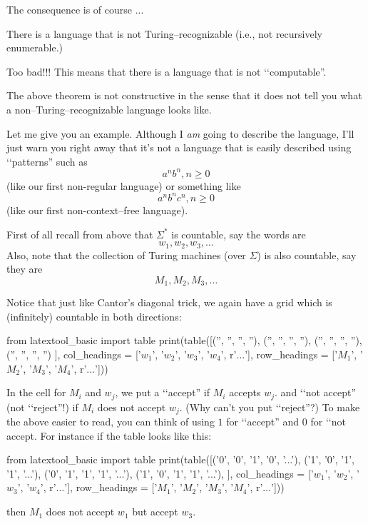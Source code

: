 The consequence is of course ...

\begin{thm}
There is a language that is not Turing--recognizable
(i.e., not recursively enumerable.)
\end{thm}

Too bad!!!
This means that there is a language that is not \lq\lq computable''.

The above theorem is not constructive in the sense that
it does not tell you what a non--Turing--recognizable language looks like.

Let me give you an example.
Although I \textit{am} going to describe the language,
I'll just warn you right away that it's not a language that is easily
described using \lq\lq patterns''
such as 
\[
a^n b^n, n \geq 0
\]
(like our first non-regular language) or something like
\[
a^n b^n c^n, n \geq 0
\]
(like our first non-context--free language).

First of all recall from above that $\Sigma^*$ is countable,
say the words are
\[
w_1, w_2, w_3, \ldots
\]
Also, note that the collection of Turing machines (over $\Sigma$) is also 
countable, say they are
\[
M_1, M_2, M_3, \ldots
\]

Notice that just like Cantor's diagonal trick, we again have
a grid which is (infinitely) countable in both directions:
\begin{python}
from latextool_basic import table
print(table([('', '', '', ''),
('', '', '', ''),
('', '', '', ''),
('', '', '', '')
],
col_headings = ['$w_1$', '$w_2$', '$w_3$', '$w_4$', r'$\ldots$'],
row_headings = ['$M_1$', '$M_2$', '$M_3$', '$M_4$', r'$\ldots$']))
\end{python}

In the cell for $M_i$ and $w_j$, we put a \lq\lq accept'' 
if $M_i$ accepts $w_j$.
and \lq\lq not accept'' (not \lq\lq reject''!) if $M_i$ 
does not accept $w_j$.
(Why can't you put \lq\lq reject''?)
To make the above easier to read, you can think of using 
$1$ for \lq\lq accept'' and $0$ for \lq\lq not accept.
For instance if the table looks like this:
\begin{python}
from latextool_basic import table
print(table([('0', '0', '1', '0', '...'),
('1', '0', '1', '1', '...'),
('0', '1', '1', '1', '...'),
('1', '0', '1', '1', '...'),
],
col_headings = ['$w_1$', '$w_2$', '$w_3$', '$w_4$', r'$\ldots$'],
row_headings = ['$M_1$', '$M_2$', '$M_3$', '$M_4$', r'$\ldots$']))
\end{python}

then $M_1$ does not accept $w_1$ but accept $w_3$.

